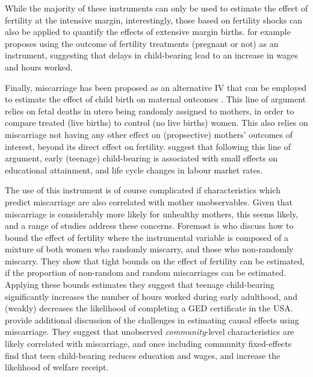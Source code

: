 While the majority of these instruments can only be used to estimate the effect
of fertility at the intensive margin, interestingly, those based on fertility
shocks can also be applied to quantify the effects of extensive margin births. 
\citet{Cristia2008} for example proposes using the outcome of fertility 
treatments (pregnant or not) as an instrument, suggesting that delays in 
child-bearing lead to an increase in wages and hours worked.

Finally, miscarriage has been proposed as an alternative IV that can be employed 
to estimate the effect of child birth on maternal outcomes \citep{Hotzetal2005,
Fletcher2012}. This line of argument relies on fetal deaths in utero being 
randomly assigned to mothers, in order to compare treated (live births) to 
control (no live births) women. This also relies on miscarriage not having any 
other effect on (propsective) mothers' outcomes of interest, beyond its direct 
effect on fertility. \citet{Hotzetal2005} suggest that following this line of 
argument, early (teenage) child-bearing is associated with small effects on 
educational attainment, and life cycle changes in labour market rates.

The use of this instrument is of course complicated if characteristics which
predict miscarriage are also correlated with mother unobservables. Given that
miscarriage is considerably more likely for unhealthy mothers, this seems likely,
and a range of studies address these concerns.  Foremost is \citet{Hotzetal1997} 
who discuss how to bound the effect of fertility where the instrumental variable
is composed of a mixture of both women who randomly miscarry, and those who 
non-randomly miscarry.  They show that tight bounds on the effect of fertility can 
be estimated, if the proportion of non-random and random miscarriages can be
estimated.  Applying these bounds estimates they suggest that teenage child-bearing
significantly increases the number of hours worked during early adulthood, and
(weakly) decreases the likelihood of completing a GED certificate in the USA.
\citet{FletcherWolfe2009} provide additional discussion of the challenges in
estimating causal effects using miscarriage.  They suggest that unobserved
\emph{community}-level characteristics are likely correlated with miscarriage, 
and once including community fixed-effects find that teen child-bearing reduces
education and wages, and increase the likelihood of welfare receipt.


